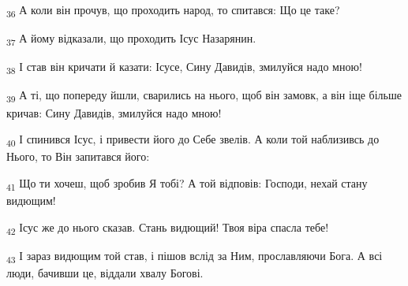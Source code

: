 \begin{tcolorbox}
\textsubscript{36} А коли він прочув, що проходить народ, то спитався: Що це таке?
\end{tcolorbox}
\begin{tcolorbox}
\textsubscript{37} А йому відказали, що проходить Ісус Назарянин.
\end{tcolorbox}
\begin{tcolorbox}
\textsubscript{38} І став він кричати й казати: Ісусе, Сину Давидів, змилуйся надо мною!
\end{tcolorbox}
\begin{tcolorbox}
\textsubscript{39} А ті, що попереду йшли, сварились на нього, щоб він замовк, а він іще більше кричав: Сину Давидів, змилуйся надо мною!
\end{tcolorbox}
\begin{tcolorbox}
\textsubscript{40} І спинився Ісус, і привести його до Себе звелів. А коли той наблизивсь до Нього, то Він запитався його:
\end{tcolorbox}
\begin{tcolorbox}
\textsubscript{41} Що ти хочеш, щоб зробив Я тобі? А той відповів: Господи, нехай стану видющим!
\end{tcolorbox}
\begin{tcolorbox}
\textsubscript{42} Ісус же до нього сказав. Стань видющий! Твоя віра спасла тебе!
\end{tcolorbox}
\begin{tcolorbox}
\textsubscript{43} І зараз видющим той став, і пішов вслід за Ним, прославляючи Бога. А всі люди, бачивши це, віддали хвалу Богові.
\end{tcolorbox}
